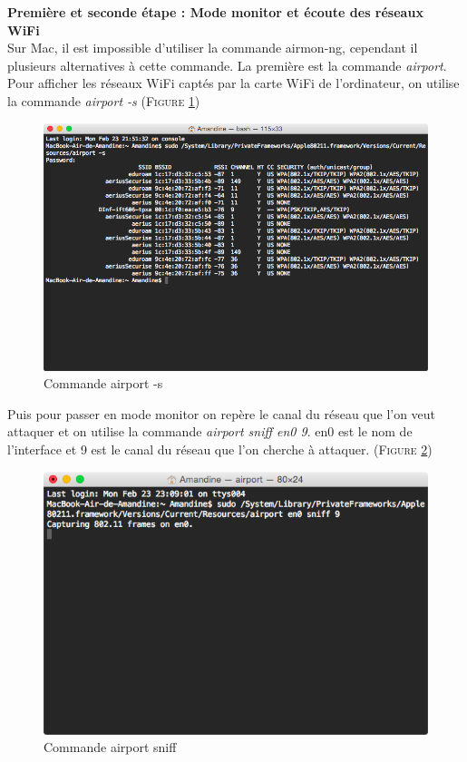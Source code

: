 \documentclass[11pt]{article}
\begin{document}
\textbf{Première et seconde étape : Mode monitor et écoute des réseaux WiFi}~\\
Sur Mac, il est impossible d'utiliser la commande airmon-ng, cependant il plusieurs alternatives à cette commande. 
La première est la commande \textit{airport}.
Pour afficher les réseaux WiFi captés par la carte WiFi de l'ordinateur, on utilise la commande \textit{airport -s} (\textsc{Figure \ref{fig:airport}}) 
\begin{figure}[hbtp]
        \centering \includegraphics[scale=0.4]{Exercice1/airport.png}
        \caption{Commande airport -s}
         \label{fig:airport}
\end{figure}
Puis pour passer en mode monitor on repère le canal du réseau que l'on veut attaquer et on utilise la commande \textit{airport sniff en0 9}. en0 est le nom de l'interface et 9 est le canal du réseau que l'on cherche à attaquer. (\textsc{Figure \ref{fig:airport2}}) 

\begin{figure}[hbtp]
        \centering \includegraphics[scale=0.4]{Exercice1/airport2.png}
        \caption{Commande airport sniff}
         \label{fig:airport2}
\end{figure}
\end{document}
